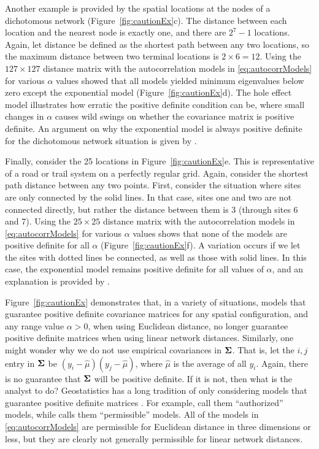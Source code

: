 \documentclass[11pt, titlepage]{article}\usepackage[]{graphicx}\usepackage[]{color}
\begin{document}
\begin{spacing}{1.9}
\begin{flushleft}
Another example is provided by the spatial locations at the nodes of a dichotomous network (Figure~\ref{fig:cautionEx}c). The distance between each location and the nearest node is exactly one, and there are $2^7 - 1$ locations.  Again, let distance be defined as the shortest path between any two locations, so the maximum distance between two terminal locations is $2 \times 6 = 12$.  Using the $127 \times 127$ distance matrix with the autocorrelation models in \ref{eq:autocorrModels} for various $\alpha$ values showed that all models yielded minimum eigenvalues below zero except the exponential model (Figure~\ref{fig:cautionEx}d).  The hole effect model illustrates how erratic the positive definite condition can be, where small changes in $\alpha$ causes wild swings on whether the covariance matrix is positive definite. An argument on why the exponential model is always positive definite for the dichotomous network situation is given by \citet{Ver:Pete:Move:2010}.

Finally, consider the 25 locations in Figure~\ref{fig:cautionEx}e.  This is representative of a road or trail system on a perfectly regular grid.  Again, consider the shortest path distance between any two points.  First, consider the situation where sites are only connected by the solid lines.  In that case, sites one and two are not connected directly, but rather the distance between them is 3 (through sites 6 and 7).  Using the $25 \times 25$ distance matrix with the autocorrelation models in \ref{eq:autocorrModels} for various $\alpha$ values shows that none of the models are positive definite for all $\alpha$ (Figure~\ref{fig:cautionEx}f). A variation occurs if we let the sites with dotted lines be connected, as well as those with solid lines.  In this case, the exponential model remains positive definite for all values of $\alpha$, and an explanation is provided by \citet{Curr:NonE:2006}.

Figure~\ref{fig:cautionEx} demonstrates that, in a variety of situations, models that guarantee positive definite covariance matrices for any spatial configuration, and any range value $\alpha > 0$, when using Euclidean distance, no longer guarantee positive definite matrices when using linear network distances. Similarly, one might wonder why we do not use empirical covariances in $\mbox{\boldmath $\Sigma$}$.  That is, let the $i,j$ entry in $\mbox{\boldmath $\Sigma$}$ be $(y_i - \hat{\mu})(y_j - \hat{\mu})$, where $\hat{\mu}$ is the average of all $y_i$.  Again, there is no guarantee that $\mbox{\boldmath $\Sigma$}$ will be positive definite.  If it is not, then what is the analyst to do? Geostatistics has a long tradition of only considering models that guarantee positive definite matrices \citep[][p. 161]{Jour:Huij:mini:1978}. For example, \citet[][p. 80]{Webs:Oliv:geos:2007} call them ``authorized'' models, while \citet[][p. 87]{Goov:geos:1997} calls them ``permissible'' models.  All of the models in \ref{eq:autocorrModels} are permissible for Euclidean distance in three dimensions or less, but they are clearly not generally permissible for linear network distances.


\end{flushleft}
\end{spacing}
\end{document}
